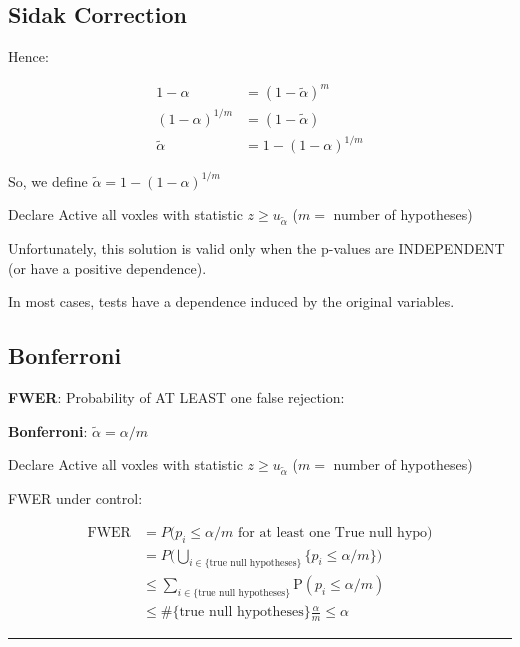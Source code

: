 \documentclass[]{article}
\begin{document}
\subsection{Sidak Correction}\label{sidak-correction-1}

Hence:

\[
\begin{aligned}
    1- \alpha &= (1- \widetilde{\alpha})^{m} \\
    (1- \alpha)^{1/m} &= (1- \widetilde{\alpha}) \\
  \widetilde{\alpha} &= 1- (1- \alpha)^{1/m} 
\end{aligned}
\]

So, we define \(\widetilde{\alpha} = 1- (1- \alpha)^{1/m}\)

Declare Active all voxles with statistic
\(z \geq u_{\widetilde{\alpha}}\) (\(m =\) number of hypotheses)

Unfortunately, this solution is valid only when the p-values are
INDEPENDENT (or have a positive dependence).

In most cases, tests have a dependence induced by the original
variables.

\subsection{Bonferroni}\label{bonferroni}

\textbf{FWER}: Probability of AT LEAST one false rejection:

\textbf{Bonferroni}: \(\widetilde{\alpha} = \alpha/m\)

Declare Active all voxles with statistic
\(z \geq u_{\widetilde{\alpha}}\) (\(m =\) number of hypotheses)

FWER under control:

\[
\begin{aligned}
\mathrm{FWER} & =  P \big (p_i \leq \alpha / m \textrm{ for at least one True null hypo} \big) \\
& =  P \Big (\bigcup_{i \in \{\textrm{true null hypotheses}\}} \{p_i \leq \alpha / m \} \Big) \\
& \leq  \sum_{i \in \{\textrm{true null hypotheses}\}} \mathrm{P} (p_i \leq \alpha / m) \\
& \leq \#\{\textrm{true null hypotheses} \} \frac{\alpha}{m} \leq \alpha
\end{aligned}
\]

\begin{center}\rule{0.5\linewidth}{\linethickness}\end{center}
\end{document}
